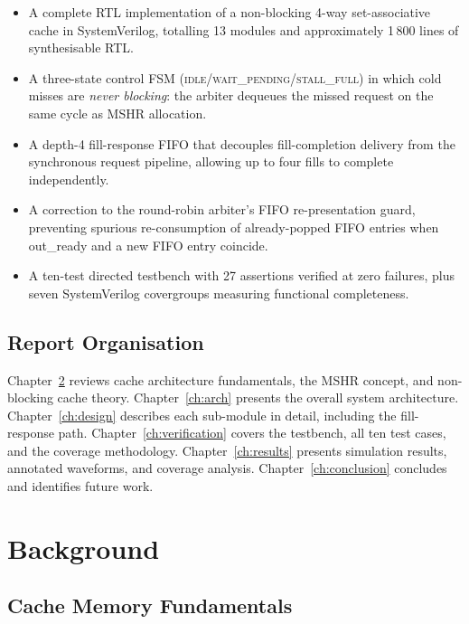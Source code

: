 \documentclass[12pt,letterpaper]{report}
\begin{document}
\begin{itemize}
  \item A complete RTL implementation of a non-blocking 4-way
        set-associative cache in SystemVerilog, totalling 13 modules
        and approximately 1\,800 lines of synthesisable RTL.
  \item A three-state control FSM (\textsc{idle}/\textsc{wait\_pending}/\textsc{stall\_full})
        in which cold misses are \emph{never blocking}: the arbiter
        dequeues the missed request on the same cycle as MSHR
        allocation.
  \item A depth-4 fill-response FIFO that decouples fill-completion
        delivery from the synchronous request pipeline, allowing up
        to four fills to complete independently.
  \item A correction to the round-robin arbiter's FIFO re-presentation
        guard, preventing spurious re-consumption of already-popped
        FIFO entries when out\_ready and a new FIFO entry coincide.
  \item A ten-test directed testbench with 27 assertions verified at
        zero failures, plus seven SystemVerilog covergroups measuring
        functional completeness.
\end{itemize}

\section{Report Organisation}

Chapter~\ref{ch:background} reviews cache architecture fundamentals,
the MSHR concept, and non-blocking cache theory.
Chapter~\ref{ch:arch} presents the overall system architecture.
Chapter~\ref{ch:design} describes each sub-module in detail, including
the fill-response path.
Chapter~\ref{ch:verification} covers the testbench, all ten test
cases, and the coverage methodology.
Chapter~\ref{ch:results} presents simulation results, annotated
waveforms, and coverage analysis.
Chapter~\ref{ch:conclusion} concludes and identifies future work.

\chapter{Background}
\label{ch:background}

\section{Cache Memory Fundamentals}
\end{document}
